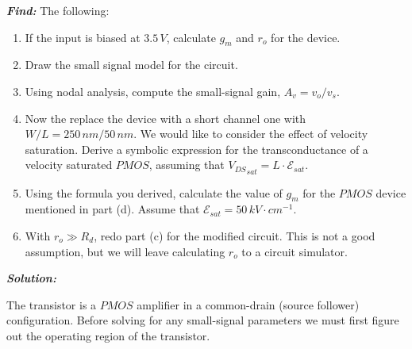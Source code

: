 \documentclass[12pt, fleqn]{article}
\begin{document}
\noindent
\textbf{\emph{Find: }} The following:

\begin{enumerate}[label=(\alph*)]
    \item{If the input is biased at $3.5\,V$, calculate $g_m$ and $r_o$ for the device.}
    \item{Draw the small signal model for the circuit.}
    \item{Using nodal analysis, compute the small-signal gain, $A_v = v_o / v_s$.}
    \item{Now the replace the device with a short channel one with $W/L = 250\,nm / 50\,nm$. We would like to consider the eﬀect of velocity saturation.  Derive a symbolic expression for the transconductance of a velocity saturated $PMOS$, assuming that ${V_{DS}}_{sat} = L \cdot \mathcal{E}_{sat}$.}
    \item{Using the formula you derived, calculate the value of $g_m$ for the $PMOS$ device mentioned in part (d). Assume that $\mathcal{E}_{sat} = 50\,kV \cdot cm^{-1}$.}
    \item{With $r_o \gg R_d$, redo part (c) for the modified circuit. This is not a good assumption, but we will leave calculating $r_o$ to a circuit simulator.}
\end{enumerate}

\newpage\noindent
\textbf{\emph{Solution: }}

\noindent
The transistor is a $PMOS$ amplifier in a common-drain (source follower) configuration.  Before solving for any small-signal parameters we must first figure out the operating region of the transistor.
\end{document}

